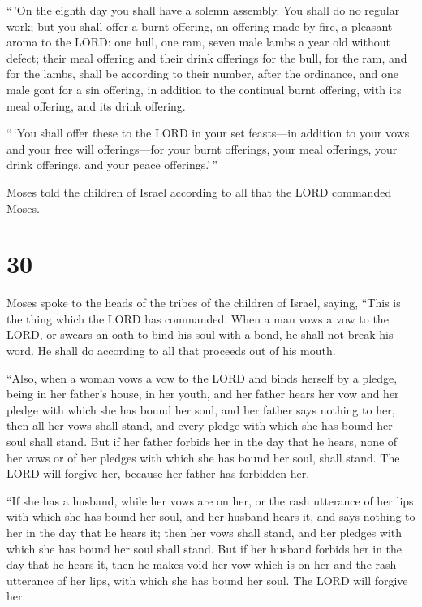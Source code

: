 ``\,'On the eighth day you shall have a solemn assembly.
You shall do no regular work;  but you shall offer a burnt
offering, an offering made by fire, a pleasant aroma to the LORD: one
bull, one ram, seven male lambs a year old without defect; 
their meal offering and their drink offerings for the bull, for the ram,
and for the lambs, shall be according to their number, after the
ordinance,  and one male goat for a sin offering, in
addition to the continual burnt offering, with its meal offering, and
its drink offering.

 ``\,`You shall offer these to the LORD in your set
feasts---in addition to your vows and your free will offerings---for
your burnt offerings, your meal offerings, your drink offerings, and
your peace offerings.'\,''

 Moses told the children of Israel according to all that
the LORD commanded Moses.

\hypertarget{section-29}{%
\section{30}\label{section-29}}

 Moses spoke to the heads of the tribes of the children of
Israel, saying, ``This is the thing which the LORD has commanded.
 When a man vows a vow to the LORD, or swears an oath to
bind his soul with a bond, he shall not break his word. He shall do
according to all that proceeds out of his mouth.

 ``Also, when a woman vows a vow to the LORD and binds
herself by a pledge, being in her father's house, in her youth,
 and her father hears her vow and her pledge with which she
has bound her soul, and her father says nothing to her, then all her
vows shall stand, and every pledge with which she has bound her soul
shall stand.  But if her father forbids her in the day that
he hears, none of her vows or of her pledges with which she has bound
her soul, shall stand. The LORD will forgive her, because her father has
forbidden her.

 ``If she has a husband, while her vows are on her, or the
rash utterance of her lips with which she has bound her soul,
 and her husband hears it, and says nothing to her in the
day that he hears it; then her vows shall stand, and her pledges with
which she has bound her soul shall stand.  But if her
husband forbids her in the day that he hears it, then he makes void her
vow which is on her and the rash utterance of her lips, with which she
has bound her soul. The LORD will forgive her.

